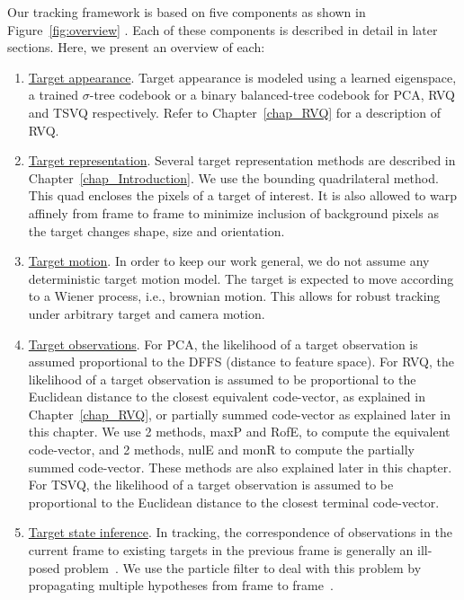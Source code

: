 \begin{Body}
Our tracking framework is based on five components as shown in Figure~\ref{fig:overview} .  Each of these components is described in detail in later sections.  Here, we present an overview of each:

\begin{enumerate}
\item \underline{ Target appearance}.  Target appearance is modeled using a learned eigenspace, a trained $\sigma$-tree codebook or a binary balanced-tree codebook for PCA, RVQ and TSVQ respectively.  Refer to Chapter~\ref{chap_RVQ} for a description of RVQ.

\item \underline{Target representation}.  Several target representation methods are described in Chapter~\ref{chap_Introduction}.  We use the bounding quadrilateral method.  This quad encloses the pixels of a target of interest.  It is also allowed to warp affinely from frame to frame to minimize inclusion of background pixels as the target changes shape, size and orientation.

\item \underline{Target motion}.  In order to keep our work general, we do not assume any deterministic target motion model.  The target is expected to move according to a Wiener process, i.e., brownian motion.  This allows for robust tracking under arbitrary target and camera motion.

\item \underline{Target observations}.  For PCA, the likelihood of a target observation is assumed proportional to the DFFS (distance to feature space).  For RVQ, the likelihood of a target observation is assumed to be proportional to the Euclidean distance to the closest equivalent code-vector, as explained in Chapter~\ref{chap_RVQ}, or partially summed code-vector as explained later in this chapter.  We use 2 methods, maxP and RofE, to compute the equivalent code-vector, and 2 methods, nulE and monR to compute the partially summed code-vector.  These methods are also explained later in this chapter. For TSVQ, the likelihood of a target observation is assumed to be proportional to the Euclidean distance to the closest terminal code-vector.

\item \underline{Target state inference}.  In tracking, the correspondence of observations in the current frame to existing targets in the previous frame is generally an ill-posed problem~\cite{2005_CNF_TRK_Yang}.  We use the particle filter to deal with this problem by propagating multiple hypotheses from frame to frame~\cite{1998_JNL_Condensation_IsardBlake}.


\end{enumerate}
\end{Body}
